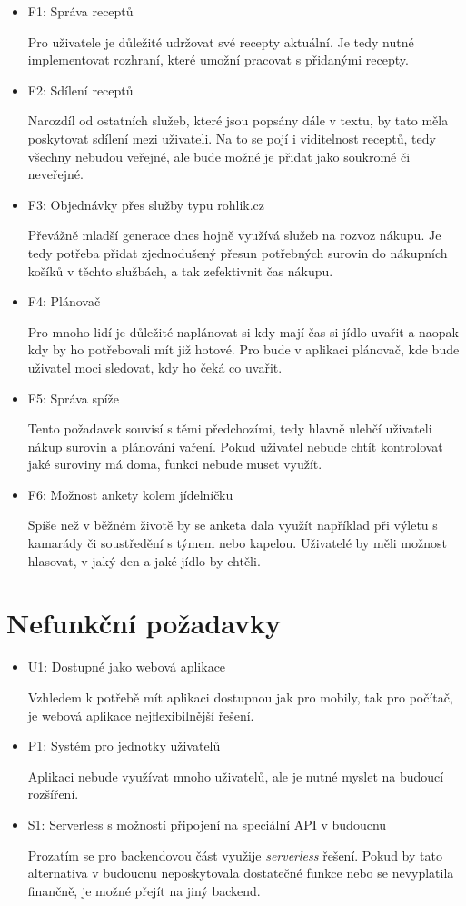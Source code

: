 \begin{itemize}
    \item F1: Správa receptů

    Pro uživatele je důležité udržovat své recepty aktuální. Je tedy nutné implementovat rozhraní, které umožní pracovat s
    přidanými recepty.
    \item F2: Sdílení receptů

    Narozdíl od ostatních služeb, které jsou popsány dále v textu, by tato měla poskytovat sdílení mezi uživateli. Na to se pojí i
    viditelnost receptů, tedy všechny nebudou veřejné, ale bude možné je přidat jako soukromé či neveřejné.
    \item F3: Objednávky přes služby typu rohlik.cz

    Převážně mladší generace dnes hojně využívá služeb na rozvoz nákupu. Je tedy potřeba přidat zjednodušený přesun potřebných
    surovin do nákupních košíků v těchto službách, a tak zefektivnit čas nákupu.
    \item F4: Plánovač

    Pro mnoho lidí je důležité naplánovat si kdy mají čas si jídlo uvařit a naopak kdy by ho potřebovali mít již hotové. Pro bude v
    aplikaci plánovač, kde bude uživatel moci sledovat, kdy ho čeká co uvařit.
    \item F5: Správa spíže

    Tento požadavek souvisí s těmi předchozími, tedy hlavně ulehčí uživateli nákup surovin a plánování vaření. Pokud uživatel nebude chtít
    kontrolovat jaké suroviny má doma, funkci nebude muset využít.
    \item F6: Možnost ankety kolem jídelníčku

    Spíše než v běžném životě by se anketa dala využít například při výletu s kamarády či soustředění s týmem nebo kapelou. Uživatelé
    by měli možnost hlasovat, v jaký den a jaké jídlo by chtěli.
\end{itemize}

\section{Nefunkční požadavky}

\begin{itemize}
    \item U1: Dostupné jako webová aplikace

    Vzhledem k potřebě mít aplikaci dostupnou jak pro mobily, tak pro počítač, je webová aplikace nejflexibilnější řešení.
    \item P1: Systém pro jednotky uživatelů

    Aplikaci nebude využívat mnoho uživatelů, ale je nutné myslet na budoucí rozšíření.
    \item S1: Serverless s možností připojení na speciální API v budoucnu

    Prozatím se pro backendovou část využije \emph{serverless} řešení. Pokud by tato alternativa v budoucnu neposkytovala dostatečné
    funkce nebo se nevyplatila finančně, je možné přejít na jiný backend.
\end{itemize}

